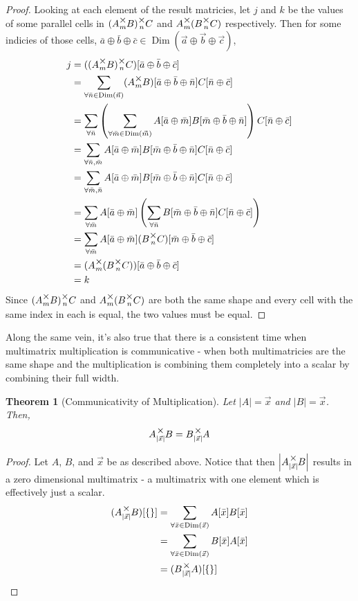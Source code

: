 \documentclass[12pt]{book}
\theoremstyle{plain}
\newtheorem{theorem}{Theorem}[chapter]
\theoremstyle{definition}
\theoremstyle{ppart}
\theoremstyle{case}
\theoremstyle{solution}
\DeclareMathOperator{\Dim}{Dim}
\newcommand{\mmult}[1]{\text{\raisebox{1ex}{$\underset{#1}{\times}$}}}
\newcommand{\shape}[1]{\left|#1\right|}
\begin{document}
\begin{proof}
Looking at each element of the result matricies, let $j$ and $k$ be the values
of some parallel cells in $(A \mmult{m} B) \mmult{n} C$ and
$A \mmult{m} (B \mmult{n} C)$ respectively. Then for some indicies of those cells,
$\bar{a} \oplus \bar{b} \oplus \bar{c} \in
\Dim(\vec{a} \oplus \vec{b} \oplus \vec{c})$,
\begin{align*}
 j
 &= ((A \mmult{m} B) \mmult{n} C)[\bar{a} \oplus \bar{b} \oplus \bar{c}] \\
 &= \sum_{\forall \bar{n} \in \Dim(\vec{n})}
 (A \mmult{m} B)[\bar{a} \oplus \bar{b} \oplus \bar{n}]
 C[\bar{n} \oplus \bar{c}] \\
 &= \sum_{\forall \bar{n}}
 \left(
  \sum_{\forall \bar{m} \in \Dim(\vec{m})}
  A[\bar{a} \oplus \bar{m}]B[\bar{m} \oplus \bar{b} \oplus \bar{n}]
 \right)
 C[\bar{n} \oplus \bar{c}] \\
 &= \sum_{\forall \bar{n}, \bar{m}}
 A[\bar{a} \oplus \bar{m}]
 B[\bar{m} \oplus \bar{b} \oplus \bar{n}]
 C[\bar{n} \oplus \bar{c}] \\
 &= \sum_{\forall \bar{m}, \bar{n}}
 A[\bar{a} \oplus \bar{m}]
 B[\bar{m} \oplus \bar{b} \oplus \bar{n}]
 C[\bar{n} \oplus \bar{c}] \\
 &= \sum_{\forall \bar{m}}
 A[\bar{a} \oplus \bar{m}]
 \left(
 \sum_{\forall \bar{n}}
  B[\bar{m} \oplus \bar{b} \oplus \bar{n}]
  C[\bar{n} \oplus \bar{c}]
 \right) \\
 &= \sum_{\forall \bar{m}}
 A[\bar{a} \oplus \bar{m}]
 (B \mmult{n} C)[\bar{m} \oplus \bar{b} \oplus \bar{c}] \\
 &= (A \mmult{m} (B \mmult{n} C))[\bar{a} \oplus \bar{b} \oplus \bar{c}] \\
 &= k
\end{align*}
Since $(A \mmult{m} B) \mmult{n} C$ and $A \mmult{m} (B \mmult{n} C)$ are both
the same shape and every cell with the same index in each is equal, the two
values must be equal.
\end{proof}

Along the same vein, it's also true that there is a consistent time when
multimatrix multiplication is communicative - when both multimatricies are
the same shape and the multiplication is combining them completely into a
scalar by combining their full width.

\begin{theorem}[Communicativity of Multiplication]
Let $\shape{A} = \vec{x}$ and $\shape{B} = \vec{x}$. Then,
\[ A \mmult{\shape{\vec{x}}} B = B \mmult{\shape{\vec{x}}} A \]
\end{theorem}
\begin{proof}
Let $A$, $B$, and $\vec{x}$ be as described above. Notice that then $\shape{A \mmult{\shape{\vec{x}}} B}$
results in a zero dimensional multimatrix - a multimatrix with one element which is effectively
just a scalar.
\begin{align*}
(A \mmult{\shape{\vec{x}}} B)[\{\}]
  &= \sum_{\forall \bar{x} \in \Dim(\vec{x})} A[\bar{x}]B[\bar{x}] \\
  &= \sum_{\forall \bar{x} \in \Dim(\vec{x})} B[\bar{x}]A[\bar{x}] \\
  &= (B \mmult{\shape{\vec{x}}} A)[\{\}]
\end{align*}
\end{proof}
\end{document}
